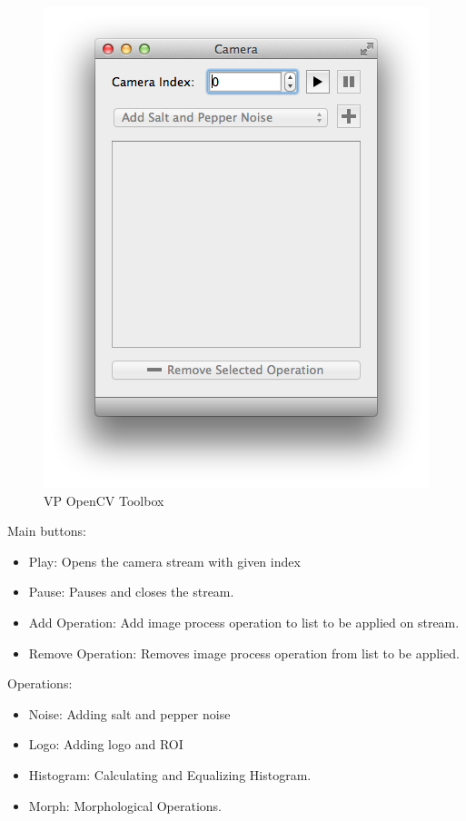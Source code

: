\documentclass{article}
\begin{document}
\begin{figure}[H]
\begin{center}
\includegraphics[scale=0.4]{cameraToolbox.png}
\caption{VP OpenCV Toolbox}
\end{center}
\end{figure}	
	
	Main buttons:
	\begin{itemize}
		\item Play: Opens the camera stream with given index
		\item Pause: Pauses and closes the stream.
		\item Add Operation: Add image process operation to list to be applied on stream.
		\item Remove Operation: Removes image process operation from list to be applied.
	\end{itemize}
	
	Operations:
	\begin{itemize}
		\item Noise: Adding salt and pepper noise
		\item Logo: Adding logo and ROI
		\item Histogram: Calculating and Equalizing Histogram.
		\item Morph: Morphological Operations.
	\end{itemize}
	
\end{document}
